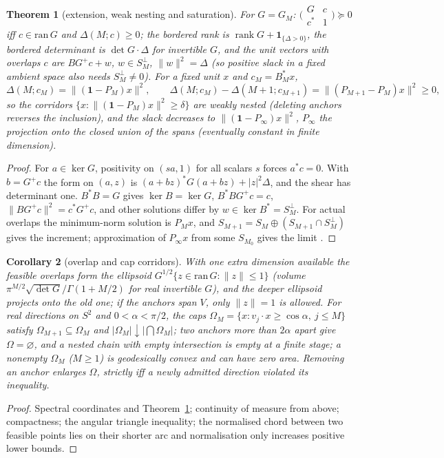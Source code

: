 \documentclass[aps,pra,onecolumn,superscriptaddress,nofootinbib,10pt]{revtex4-2}
\newtheorem{theorem}{Theorem}
\newtheorem{corollary}[theorem]{Corollary}
\theoremstyle{definition}
\theoremstyle{remark}
\newcommand{\rk}{\operatorname{rank}}
\begin{document}
\begin{theorem}[extension, weak nesting and saturation]\label{thm:fmschur}
For $G=G_M$: $\bigl(\begin{smallmatrix}G&c\\ c^*&1\end{smallmatrix}\bigr)\succeq0$ iff $c\in\mathrm{ran}\,G$ and $\Delta(M;c)\ge0$; the bordered rank is $\rk G+\mathbf1_{\{\Delta>0\}}$, the
bordered determinant is $\det G\cdot\Delta$ for invertible $G$, and the unit vectors with overlaps $c$ are $BG^+c+w$, $w\in S_M^\perp$,
$\lVert w\rVert^2=\Delta$ (so positive slack in a fixed ambient space also needs $S_M^\perp\ne0$).  For a fixed unit $x$ and $c_M=B_M^*x$,
\[
\Delta(M;c_M)=\lVert(\mathbf1-P_M)x\rVert^2,\qquad \Delta(M;c_M)-\Delta(M{+}1;c_{M+1})=\lVert(P_{M+1}-P_M)x\rVert^2\ge0 ,
\]
so the corridors $\{x:\lVert(\mathbf1-P_M)x\rVert^2\ge\delta\}$ are \emph{weakly} nested (deleting anchors reverses the inclusion), and the slack
decreases to $\lVert(\mathbf1-P_\infty)x\rVert^2$, $P_\infty$ the projection onto the closed union of the spans (eventually constant in finite
dimension).
\end{theorem}
\begin{proof}
For $a\in\ker G$, positivity on $(sa,1)$ for all scalars $s$ forces $a^*c=0$.  With $b=G^+c$ the form on $(a,z)$ is
$(a+bz)^*G(a+bz)+\lvert z\rvert^2\Delta$, and the shear has determinant one.  $B^*B=G$ gives $\ker B=\ker G$, $B^*BG^+c=c$, $\lVert BG^+c\rVert^2=c^*G^+c$, and
other solutions differ by $w\in\ker B^*=S_M^\perp$.  For actual overlaps the minimum-norm solution is $P_Mx$, and
$S_{M+1}=S_M\oplus(S_{M+1}\cap S_M^\perp)$ gives the increment; approximation of $P_\infty x$ from some $S_{M_0}$ gives the limit
\cite{n2-schur,n2-albert}.
\end{proof}

\begin{corollary}[overlap and cap corridors]\label{cor:fmcaps}
With one extra dimension available the feasible overlaps form the ellipsoid $G^{1/2}\{z\in\mathrm{ran}\,G:\lVert z\rVert\le1\}$ (volume
$\pi^{M/2}\sqrt{\det G}/\Gamma(1+M/2)$ for real invertible $G$), and the deeper ellipsoid projects onto the old one; if the
anchors span $V$, only $\lVert z\rVert=1$ is allowed.  For real directions on $S^2$ and $0<\alpha<\pi/2$, the caps
$\Omega_M=\{x:v_j\cdot x\ge\cos\alpha,\ j\le M\}$ satisfy $\Omega_{M+1}\subseteq\Omega_M$ and $\lvert\Omega_M\rvert\downarrow\lvert\bigcap\Omega_M\rvert$; two anchors more than $2\alpha$ apart give $\Omega=\varnothing$,
and a nested chain with empty intersection is empty at a finite stage; a nonempty $\Omega_M$ ($M\ge1$) is
geodesically convex and can have zero area.  Removing an anchor enlarges $\Omega$, strictly iff a newly
admitted direction violated its inequality.
\end{corollary}
\begin{proof}
Spectral coordinates and Theorem~\ref{thm:fmschur}; continuity of measure from above; compactness; the angular
triangle inequality; the normalised chord between two feasible points lies on their shorter arc and
normalisation only increases positive lower bounds.
\end{proof}
\end{document}
